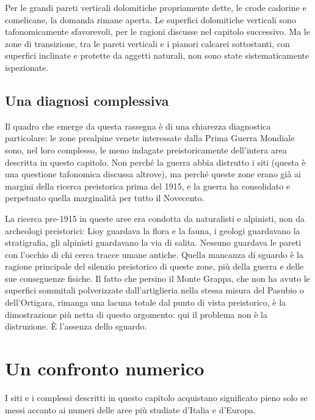 Per le grandi pareti verticali dolomitiche propriamente dette, le crode cadorine e comelicane, la domanda rimane aperta. Le superfici dolomitiche verticali sono tafonomicamente sfavorevoli, per le ragioni discusse nel capitolo successivo. Ma le zone di transizione, tra le pareti verticali e i pianori calcarei sottostanti, con superfici inclinate e protette da aggetti naturali, non sono state sistematicamente ispezionate.

\subsection{Una diagnosi complessiva}

Il quadro che emerge da questa rassegna è di una chiarezza diagnostica particolare: le zone prealpine venete interessate dalla Prima Guerra Mondiale sono, nel loro complesso, le meno indagate preistoricamente dell'intera area descritta in questo capitolo. Non perché la guerra abbia distrutto i siti (questa è una questione tafonomica discussa altrove), ma perché queste zone erano già ai margini della ricerca preistorica prima del 1915, e la guerra ha consolidato e perpetuato quella marginalità per tutto il Novecento.

La ricerca pre-1915 in queste aree era condotta da naturalisti e alpinisti, non da archeologi preistorici: Lioy guardava la flora e la fauna, i geologi guardavano la stratigrafia, gli alpinisti guardavano la via di salita. Nessuno guardava le pareti con l'occhio di chi cerca tracce umane antiche. Quella mancanza di sguardo è la ragione principale del silenzio preistorico di queste zone, più della guerra e delle sue conseguenze fisiche. Il fatto che persino il Monte Grappa, che non ha avuto le superfici sommitali polverizzate dall'artiglieria nella stessa misura del Pasubio o dell'Ortigara, rimanga una lacuna totale dal punto di vista preistorico, è la dimostrazione più netta di questo argomento: qui il problema non è la distruzione. È l'assenza dello sguardo.

\section{Un confronto numerico}

I siti e i complessi descritti in questo capitolo acquistano significato pieno solo se messi accanto ai numeri delle aree più studiate d'Italia e d'Europa.

